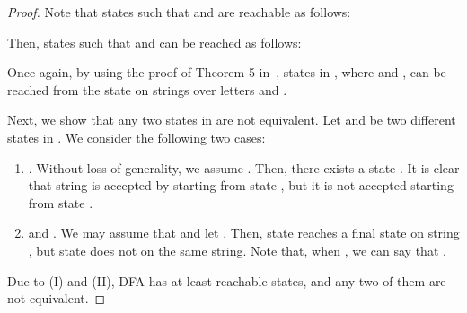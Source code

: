 \documentclass[10pt]{article}
\begin{document}
\begin{proof}
    Note that states such that  and  are reachable as follows:

Then, states such that  and  can be reached as follows:


Once again, by using the proof of Theorem 5 in~\cite{YuZhSa94}, states  in , where  and , can be reached from the state  on strings over letters  and .

Next, we show that any two states in  are not equivalent.
Let  and  be two different states in .
We consider the following two cases:
\begin{enumerate}
\item .
Without loss of generality, we assume .
Then, there exists a state .
It is clear that string  is accepted by  starting from state , but it is not accepted starting from state .

\item  and .
We may assume that  and let .
Then, state  reaches a final state on string , but state  does not on the same string.
Note that, when , we can say that .
\end{enumerate}

Due to (I) and (II), DFA  has at least  reachable states, and any two of them are not equivalent.
\end{proof}
\end{document}
